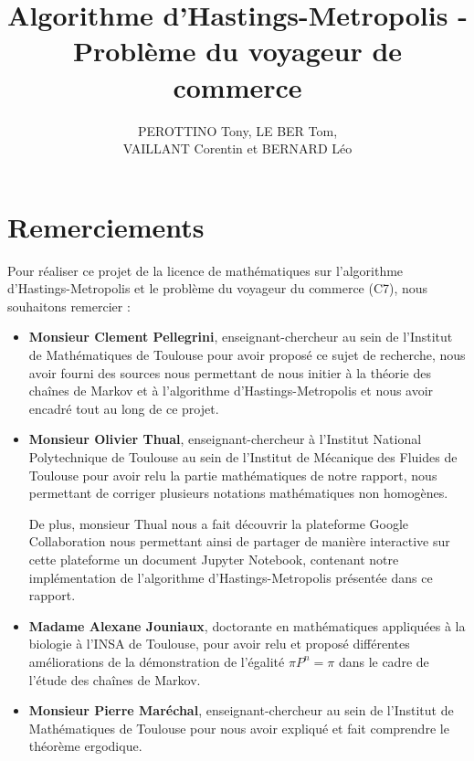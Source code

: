 \documentclass{article}
\title{Algorithme d'Hastings-Metropolis - Problème du voyageur de commerce}
\author{PEROTTINO Tony, LE BER Tom, \\ VAILLANT Corentin et BERNARD Léo}
\begin{document}
\maketitle
\thispagestyle{empty}

\newpage
\thispagestyle{empty}
\tableofcontents

\newpage
\thispagestyle{empty}

\section*{Remerciements}
Pour réaliser ce projet de la licence de mathématiques sur l'algorithme d'Hastings-Metropolis et le problème du voyageur du commerce (C7), nous souhaitons remercier : \\

\begin{itemize}
    \item \textbf{Monsieur Clement Pellegrini}, enseignant-chercheur au sein de l'Institut de Mathématiques de Toulouse pour avoir proposé ce sujet de recherche, nous avoir fourni des sources nous permettant de nous initier à la théorie des chaînes de Markov et à l'algorithme d'Hastings-Metropolis et nous avoir encadré tout au long de ce projet. \\
    \item \textbf{Monsieur Olivier Thual}, enseignant-chercheur à l'Institut National Polytechnique de Toulouse au sein de l'Institut de Mécanique des Fluides de Toulouse pour avoir relu la partie mathématiques de notre rapport, nous permettant de corriger plusieurs notations mathématiques non homogènes.
    
    De plus, monsieur Thual nous a fait découvrir la plateforme Google Collaboration nous permettant ainsi de partager de manière interactive sur cette plateforme un document Jupyter Notebook, contenant notre implémentation de l'algorithme d'Hastings-Metropolis présentée dans ce rapport. \\
    \item \textbf{Madame Alexane Jouniaux}, doctorante en mathématiques appliquées à la biologie à l'INSA de Toulouse, pour avoir relu et proposé différentes améliorations de la démonstration de l'égalité $\pi P^n = \pi$ dans le cadre de l'étude des chaînes de Markov. \\
    \item \textbf{Monsieur Pierre Maréchal}, enseignant-chercheur au sein de l'Institut de Mathématiques de Toulouse pour nous avoir expliqué et fait comprendre le théorème ergodique.
\end{itemize}
\end{document}
